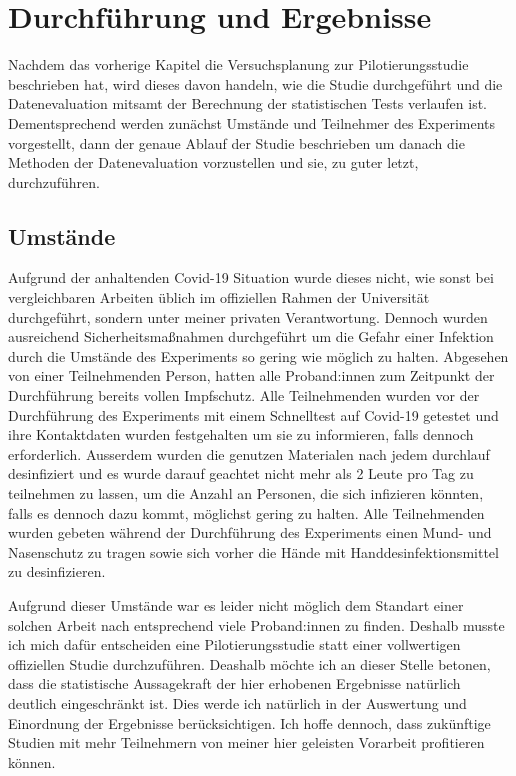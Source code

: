 


\chapter{Durchführung und Ergebnisse}\label{}
    Nachdem das vorherige Kapitel die Versuchsplanung zur Pilotierungsstudie beschrieben hat, wird dieses davon handeln, wie die Studie durchgeführt und die Datenevaluation mitsamt der Berechnung der statistischen Tests verlaufen ist. Dementsprechend werden zunächst Umstände und Teilnehmer des Experiments vorgestellt, dann der genaue Ablauf der Studie beschrieben um danach die Methoden der Datenevaluation vorzustellen und sie, zu guter letzt, durchzuführen.

    \section{Umstände}\label{sec:circumstances}
        Aufgrund der anhaltenden Covid-19 Situation wurde dieses nicht, wie sonst bei vergleichbaren Arbeiten üblich im offiziellen Rahmen der Universität durchgeführt, sondern unter meiner privaten Verantwortung. Dennoch wurden ausreichend Sicherheitsmaßnahmen durchgeführt um die Gefahr einer Infektion durch die Umstände des Experiments so gering wie möglich zu halten. Abgesehen von einer Teilnehmenden Person, hatten alle Proband:innen zum Zeitpunkt der Durchführung bereits vollen Impfschutz.
        Alle Teilnehmenden wurden vor der Durchführung des Experiments mit einem Schnelltest auf Covid-19 getestet und ihre Kontaktdaten wurden festgehalten um sie zu informieren, falls dennoch erforderlich. Ausserdem wurden die genutzen Materialen nach jedem durchlauf desinfiziert und es wurde darauf geachtet nicht mehr als
        2 %
        Leute pro Tag zu teilnehmen zu lassen, um die Anzahl an Personen, die sich infizieren könnten, falls es dennoch dazu kommt, möglichst gering zu halten.
        Alle Teilnehmenden wurden gebeten während der Durchführung des Experiments einen Mund- und Nasenschutz zu tragen sowie sich vorher die Hände mit Handdesinfektionsmittel zu desinfizieren.

        Aufgrund dieser Umstände war es leider nicht möglich dem Standart einer solchen Arbeit nach entsprechend viele Proband:innen zu finden. Deshalb musste ich mich dafür entscheiden eine Pilotierungsstudie statt einer vollwertigen offiziellen Studie durchzuführen. Deashalb möchte ich an dieser Stelle betonen, dass die statistische Aussagekraft der hier erhobenen Ergebnisse natürlich deutlich eingeschränkt ist. Dies werde ich natürlich in der Auswertung und Einordnung der Ergebnisse berücksichtigen. Ich hoffe dennoch, dass zukünftige Studien mit mehr Teilnehmern von meiner hier geleisten Vorarbeit profitieren können.

